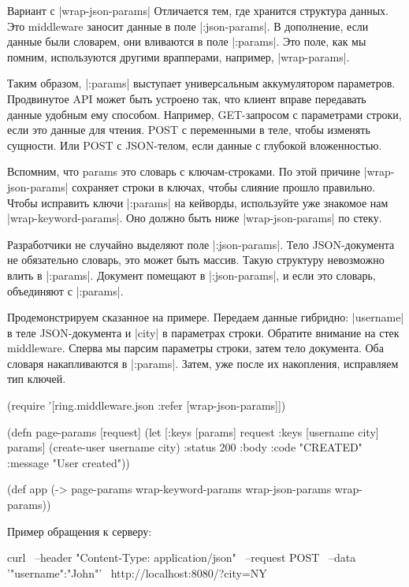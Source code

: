 Вариант с \spverb|wrap-json-params| Отличается тем, где хранится структура данных. Это
middleware заносит данные в поле \spverb|:json-params|. В дополнение, если данные были
словарем, они вливаются в поле \spverb|:params|. Это поле, как мы помним, используются
другими врапперами, например, \spverb|wrap-params|.

Таким образом, \spverb|:params| выступает универсальным аккумулятором
параметров. Продвинутое API может быть устроено так, что клиент вправе
передавать данные удобным ему способом. Например, GET-запросом с параметрами
строки, если это данные для чтения. POST с переменными в теле, чтобы изменять
сущности. Или POST с JSON-телом, если данные с глубокой вложенностью.

Вспомним, что params это словарь с ключам-строками. По этой причине
\spverb|wrap-json-params| сохраняет строки в ключах, чтобы слияние прошло
правильно. Чтобы исправить ключи \spverb|:params| на кейворды, используйте уже знакомое
нам \spverb|wrap-keyword-params|. Оно должно быть ниже \spverb|wrap-json-params| по стеку.

Разработчики не случайно выделяют поле \spverb|:json-params|. Тело JSON-документа не
обязательно словарь, это может быть массив. Такую структуру невозможно влить в
\spverb|:params|. Документ помещают в \spverb|:json-params|, и если это словарь, объединяют с
\spverb|:params|.

Продемонстрируем сказанное на примере. Передаем данные гибридно: \spverb|username| в
теле JSON-документа и \spverb|city| в параметрах строки. Обратите внимание на стек
middleware. Сперва мы парсим параметры строки, затем тело документа. Оба словаря
накапливаются в \spverb|:params|. Затем, уже после их накопления, исправляем тип
ключей.

\begin{code}
(require '[ring.middleware.json
           :refer [wrap-json-params]])

(defn page-params
  [request]
  (let [{:keys [params]} request
        {:keys [username city]} params]
    (create-user username city)
    {:status 200
     :body {:code "CREATED"
            :message "User created"}}))

(def app
  (-> page-params
      wrap-keyword-params
      wrap-json-params
      wrap-params))
\end{code}

Пример обращения к серверу:

\begin{code}
curl \
  --header "Content-Type: application/json" \
  --request POST \
  --data '{"username":"John"}' \
  http://localhost:8080/?city=NY
\end{code}

